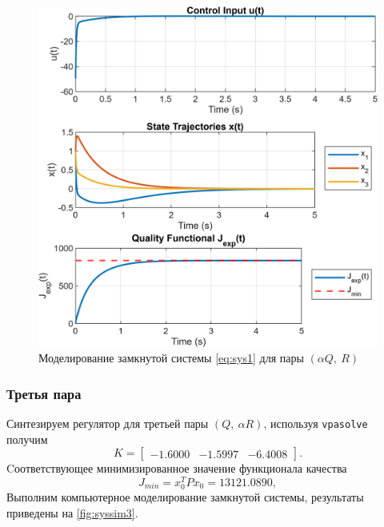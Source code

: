\begin{figure}[H]
    \centering
    \includegraphics[width=1\linewidth]{figs/1_sim2.png}
    \caption{Моделирование замкнутой системы \eqref{eq:sys1} для пары $(\alpha Q,\ R)$}
    \label{fig:syssim2}
\end{figure}

\subsubsection{Третья пара}

Синтезируем регулятор для третьей пары $(Q,\ \alpha R)$, используя \texttt{vpasolve}
получим
\begin{equation*}
    K=\begin{bmatrix}
        -1.6000  & -1.5997  & -6.4008
    \end{bmatrix}.
\end{equation*}
Cоответствующее минимизированное значение функционала качества
\begin{equation*}
    J_{min}=x_0^TPx_0=13121.0890,
\end{equation*}
Выполним компьютерное моделирование замкнутой системы,
результаты приведены на \autoref{fig:syssim3}.

